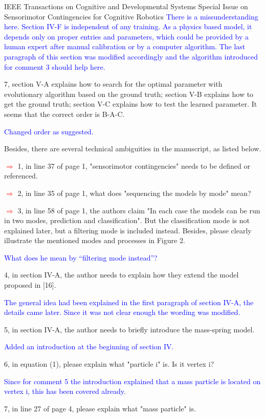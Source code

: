 \documentclass[a4paper,12pt]{letter}
\newcommand{\comment}[1]{\textcolor{blue}{#1}}
\newcommand{\marker}{\hspace*{-1.6em}\textcolor{red}{$\Longrightarrow$}}
\begin{document}
\begin{letter}{IEEE Transactions on Cognitive and Developmental Systems\newline
Special Issue on Sensorimotor Contingencies for Cognitive Robotics}
\comment{There is a missunderstanding here.  Section IV-F is independent of any training.  As a physics based model, it depends only on proper entries and parameters, which could be provided by a human expert after manual calibration or by a computer algorithm.  The last paragraph of this section was modified accordingly and the algorithm introduced for comment 3 should help here.}

7, section V-A explains how to search for the optimal parameter with evolutionary algorithm based on the ground truth; section V-B explains how to get the ground truth; section V-C explains how to test the learned parameter. It seems that the correct order is B-A-C.

\comment{Changed order as suggested.}

Besides, there are several technical ambiguities in the manuscript, as listed below. 

\marker
1, in line 37 of page 1, "sensorimotor contingencies" needs to be defined or referenced. 

\marker
2, in line 35 of page 1, what does "sequencing the models by mode" mean? 

\marker
3, in line 58 of page 1, the authors claim "In each case the models can be run in two modes, prediction and classification". But the classification mode is not explained later, but a filtering mode is included instead. Besides, please clearly illustrate the mentioned modes and processes in Figure 2.

\comment{What does he mean by ``filtering mode instead''?}

4, in section IV-A, the author needs to explain how they extend the model proposed in [16].

\comment{The general idea had been explained in the first paragraph of section IV-A, the details came later.  Since it was not clear enough the wording was modified.}

5, in section IV-A, the author needs to briefly introduce the mass-spring model.

\comment{Added an introduction at the beginning of section IV.}

6, in equation (1), please explain what "particle i" is. Is it vertex i? 

\comment{Since for comment 5 the introduction explained that a mass particle is located on vertex i, this has been covered already.}

7, in line 27 of page 4, please explain what "mass particle" is.


\end{letter}
\end{document}

